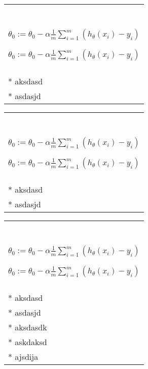 \documentclass[a4paper,12pt,ngerman,fleqn]{article}
\newcommand{\mybox}[3]{
        \centering
        \begin{tabularx}{0.9\textwidth}{|X|}
            \rowcolor{accent}
            \textcolor{white}{\textbf{#1}} \\
            \def\temp{#2}\ifx\temp\empty
                
            \else
                #2 \\ \hline
            \fi
            \\ \hline
            #3
            \\ \hline
        \end{tabularx}
    }
\begin{document}
    \begin{minipage}[t]{.51\textwidth}
        \vspace{1pt}
        \mybox
            {Section 4}
            {\( \theta_0 := \theta_0 - \alpha \frac{1}{m} \sum\limits_{i=1}^{m}(h_\theta(x_{i}) - y_{i}) \)}
            {
                * aksdasd \\
                * asdasjd
            }
        \newline
        \newline
        \newline
        \mybox
            {Section 5}
            {\( \theta_0 := \theta_0 - \alpha \frac{1}{m} \sum\limits_{i=1}^{m}(h_\theta(x_{i}) - y_{i}) \)}
            {
                * aksdasd \\
                * asdasjd
            }
        \newline
        \newline
        \newline
        \mybox
            {Section 6}
            {\( \theta_0 := \theta_0 - \alpha \frac{1}{m} \sum\limits_{i=1}^{m}(h_\theta(x_{i}) - y_{i}) \)}
            {
                * aksdasd \\
                * asdasjd \\
                * aksdasdk \\
                * askdaksd \\
                * ajsdija
            }
        \newline
    \end{minipage}
    
\end{document}
